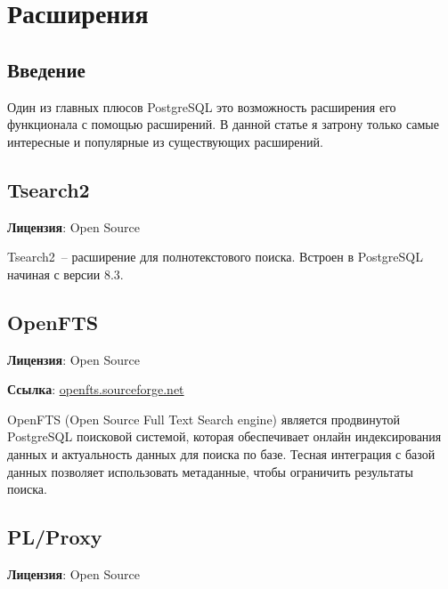 \chapter{Расширения}

\begin{epigraphs}
\end{epigraphs}

\section{Введение}

Один из главных плюсов PostgreSQL это возможность расширения его функционала с помощью расширений. В данной статье я затрону только самые интересные и популярные из существующих расширений.
















\section{Tsearch2}
\textbf{Лицензия}: Open Source

Tsearch2~-- расширение для полнотекстового поиска. Встроен в PostgreSQL начиная с версии 8.3.

\section{OpenFTS}
\textbf{Лицензия}: Open Source

\textbf{Ссылка}: \href{http://openfts.sourceforge.net/}{openfts.sourceforge.net}

OpenFTS (Open Source Full Text Search engine) является продвинутой PostgreSQL поисковой системой, которая обеспечивает онлайн индексирования данных и актуальность данных для поиска по базе. Тесная интеграция с базой данных позволяет использовать метаданные, чтобы ограничить результаты поиска.

\section{PL/Proxy}
\textbf{Лицензия}: Open Source

